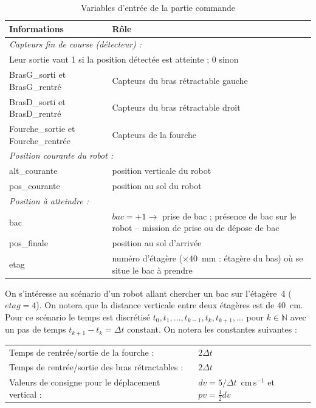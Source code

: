 \begin{table}[!ht]
\renewcommand{\arraystretch}{1.3}
\begin{tabular}{|p{7cm}|p{9cm}|}
  \hline
  \textbf{Informations} & \textbf{Rôle} \\
  \hline
  \multicolumn{2}{|l|}{\textit{Capteurs fin de course (détecteur) :}} \\
  \multicolumn{2}{|l|}{Leur sortie vaut 1 si la position détectée est atteinte ; 0 sinon} \\
  \hline
  BrasG\_sorti et BrasG\_rentré & Capteurs du bras rétractable gauche \\
  BrasD\_sorti et BrasD\_rentré & Capteurs du bras rétractable droit \\
  Fourche\_sortie et Fourche\_rentrée & Capteurs de la fourche \\
  \hline
  \multicolumn{2}{|l|}{\textit{Position courante du robot :}} \\
  \hline
  alt\_courante & position verticale du robot \\
  pos\_courante & position au sol du robot \\
  \hline
  \multicolumn{2}{|l|}{\textit{Position à atteindre :}} \\
  \hline
  bac & $bac = +1 \to$ prise de bac ; présence de bac sur le robot -- mission de prise ou de dépose de bac \\
  pos\_finale & position au sol d'arrivée \\
  etag & numéro d'étagère ($\times 40$~mm : étagère du bas) où se situe le bac à prendre \\
  \hline
\end{tabular}
\caption{\label{tab02}Variables d'entrée de la partie commande}
\end{table}

On s'intéresse au scénario d'un robot allant chercher un bac sur l'étagère~4 ($etag = 4$). On notera que la distance verticale entre deux étagères est de 40~cm. Pour ce scénario le temps est discrétisé $t_0, t_1, \ldots, t_{k-1}, t_k, t_{k+1}, \ldots$ pour $k \in \mathbb{N}$ avec un pas de temps $t_{k+1} - t_k = \Delta t$ constant. On notera les constantes
suivantes :

\begin{center}
\begin{tabular}{ll}
  Temps de rentrée/sortie de la fourche : & $2\Delta t$ \\
  Temps de rentrée/sortie des bras rétractables : & $2\Delta t$ \\
  Valeurs de consigne pour le déplacement vertical : & $dv = 5/\Delta t$~cm\,s$^{-1}$ et $pv = \frac{1}{2}dv$ \\
\end{tabular}
\end{center}

